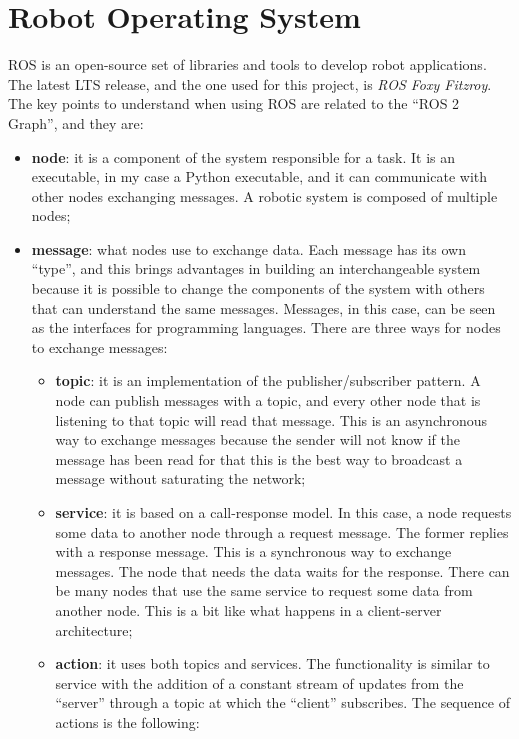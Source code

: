 \documentclass[../thesis.tex]{subfiles}
\begin{document}
\section{Robot Operating System}
\acrfull{ROS} is an open-source set of libraries and tools to develop robot applications. The latest \acrshort{LTS} release, and the one used for this project, is \textit{ROS Foxy Fitzroy}. The key points to understand when using \acrshort{ROS} are related to the ``ROS 2 Graph'', and they are:
\begin{itemize}
    \item \textbf{node}: it is a component of the system responsible for a task. It is an executable, in my case a Python executable, and it can communicate with other nodes exchanging messages. A robotic system is composed of multiple nodes;
    \item \textbf{message}: what nodes use to exchange data. Each message has its own ``type'', and this brings advantages in building an interchangeable system because it is possible to change the components of the system with others that can understand the same messages. Messages, in this case, can be seen as the interfaces for programming languages. There are three ways for nodes to exchange messages:
        \begin{itemize}
            \item \textbf{topic}: it is an implementation of the publisher/subscriber pattern. A node can publish messages with a topic, and every other node that is listening to that topic will read that message. This is an asynchronous way to exchange messages because the sender will not know if the message has been read for that this is the best way to broadcast a message without saturating the network;
            \item \textbf{service}: it is based on a call-response model. In this case, a node requests some data to another node through a request message. The former replies with a response message. This is a synchronous way to exchange messages. The node that needs the data waits for the response. There can be many nodes that use the same service to request some data from another node. This is a bit like what happens in a client-server architecture;
            \item \textbf{action}: it uses both topics and services. The functionality is similar to service with the addition of a constant stream of updates from the ``server'' through a topic at which the ``client'' subscribes. The sequence of actions is the following:
                \begin{enumerate}

\end{enumerate}
\end{itemize}
\end{itemize}
\end{document}
